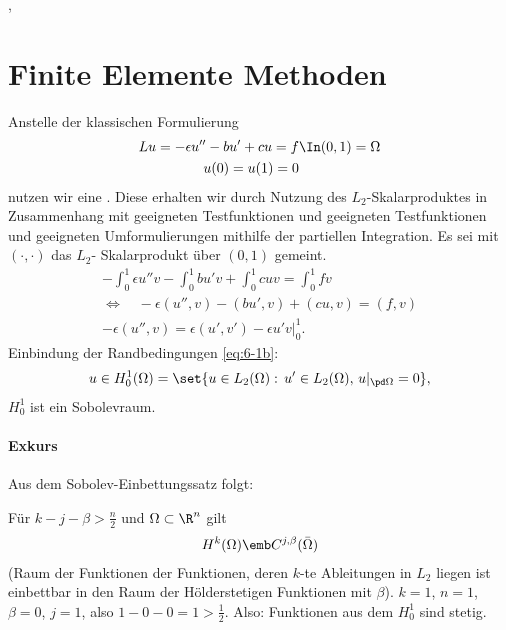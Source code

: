 
\cite {L_BOOK},
\cite{bibel}

\section{Finite Elemente Methoden}
\label{sec:finite-elem-meth}

Anstelle der klassischen Formulierung
\begin{subequations}
  \label{eq:6-1}
  \begin{align}
    Lu = - \epsilon u'' - b u' + cu = f &\In (0, 1) = \Omega \label{eq:6-1a}\\
    u(0) = u(1) = 0 & \label{eq:6-1b}
  \end{align}
\end{subequations}
nutzen wir eine . Diese erhalten wir durch Nutzung des $L_{2}$-Skalarproduktes in Zusammenhang mit geeigneten Testfunktionen und geeigneten Testfunktionen und geeigneten Umformulierungen mithilfe der partiellen Integration. Es sei mit $(\cdot, \cdot)$ das $L_{2}$- Skalarprodukt über $(0, 1)$ gemeint. 
\begin{align*}
  - \int_{0}^{1} \epsilon u'' v - \int_{0}^{1} b u' v + \int_{0}^{1} cuv = \int_{0}^{1} fv\\
  \iff \quad - \epsilon (u'', v) - (bu', v) + (cu, v) = (f, v) \\
  - \epsilon (u'', v) = \epsilon (u', v') - \epsilon u'v|_{0}^{1}. 
\end{align*}
Einbindung der Randbedingungen \eqref{eq:6-1b}:
\begin{align*}
  u \in H_{0}^{1}(\Omega) = \set{u \in L_{2}(\Omega): \, u'\in L_{2}(\Omega), \, u|_{\pd \Omega} = 0},  
\end{align*}
$H_{0}^{1}$ ist ein Sobolevraum.

\paragraph{Exkurs}
Aus dem Sobolev-Einbettungssatz folgt: 

Für $k-j-\beta > \frac n2$ und $\Omega \subset \R^{n}$ gilt
\begin{align*}
  H^{k}(\Omega) \emb C^{j, \beta}(\bar \Omega)
\end{align*}
(Raum der Funktionen der Funktionen, deren $k$-te Ableitungen in $L_{2}$ liegen ist einbettbar in den Raum der Hölderstetigen Funktionen mit $\beta$). $k =1$, $n = 1$, $\beta = 0$, $j = 1$, also $1 - 0- 0 = 1 > \frac 12$. 
Also: Funktionen aus dem $H_{0}^{1}$ sind stetig. 

